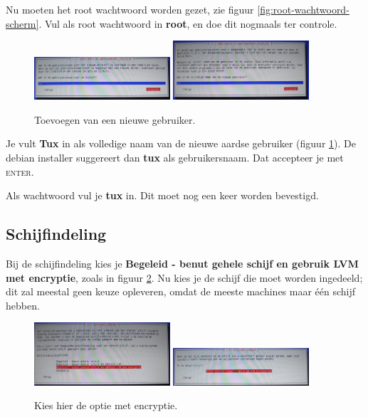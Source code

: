 \documentclass[12pt,a4paper]{article}
\begin{document}
Nu moeten het root wachtwoord worden gezet, zie figuur \ref{fig:root-wachtwoord-scherm}.
Vul als root wachtwoord in \textbf{root}, en doe dit nogmaals ter controle.

\begin{figure}[H]
\centering
\includegraphics[width=0.45\textwidth]{nieuwe-gebruiker-naam}
\includegraphics[width=0.45\textwidth]{nieuwe-gebruiker-echte-naam}
\caption{Toevoegen van een nieuwe gebruiker.}
\label{fig:nieuwe-gebruiker}
\end{figure}

Je vult \textbf{Tux} in als volledige naam van de nieuwe aardse gebruiker (figuur \ref{fig:nieuwe-gebruiker}).
De debian installer suggereert dan \textbf{tux} als gebruikersnaam.
Dat accepteer je met \textsc{enter}.

Als wachtwoord vul je \textbf{tux} in. Dit moet nog een keer worden bevestigd.


\subsection{Schijfindeling}
Bij de schijfindeling kies je \textbf{Begeleid - benut gehele schijf en gebruik LVM met encryptie}, zoals in figuur \ref{fig:schijven-indelen}.
Nu kies je de schijf die moet worden ingedeeld; dit zal meestal geen keuze opleveren, omdat de meeste machines maar \'{e}\'{e}n schijf hebben.

\begin{figure}[H]
\centering
\includegraphics[width=0.45\textwidth]{schijven-indelen-scherm}
\includegraphics[width=0.45\textwidth]{schijf-uitkiezen-scherm}
\caption{Kies hier de optie met encryptie.}
\label{fig:schijven-indelen}
\end{figure}
\end{document}
